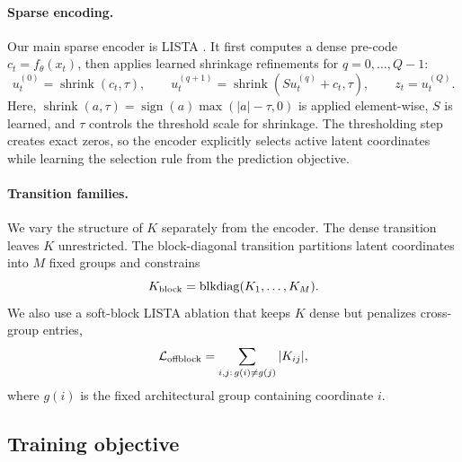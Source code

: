 \documentclass[11pt]{article}
\newcommand{\shrink}{\operatorname{shrink}}
\newcommand{\blkdiag}{\operatorname{blkdiag}}
\begin{document}
\paragraph{Sparse encoding.} Our main sparse encoder is LISTA \citep{gregor_learning_2010}. It first computes a dense pre-code \(c_t=f_\theta(x_t)\), then applies learned shrinkage refinements for $q=0,\ldots,Q-1$:
\begin{equation}
  u_t^{(0)}=\shrink(c_t,\tau),\qquad
  u_t^{(q+1)}=\shrink(Su_t^{(q)}+c_t,\tau),\qquad
  z_t=u_t^{(Q)}.
  \label{eq:lista}
\end{equation}
Here, $\shrink(a,\tau)=\operatorname{sign}(a)\max(|a|-\tau,0)$
is applied element-wise, \(S\) is learned, and \(\tau\) controls the threshold scale for shrinkage. The thresholding step creates exact zeros, so the encoder explicitly selects active latent coordinates while learning the selection rule from the prediction objective.

\paragraph{Transition families.} We vary the structure of \(K\) separately from the encoder. The dense transition leaves \(K\) unrestricted. The block-diagonal transition partitions latent coordinates into \(M\) fixed groups and constrains
\begin{equation}
  K_{\rm block}=\blkdiag(K_1,\ldots,K_M).
  \label{eq:block_transition}
\end{equation}
We also use a soft-block LISTA ablation that keeps \(K\) dense but penalizes cross-group entries,
\begin{equation}
  \mathcal{L}_{\rm offblock}
  =
  \sum_{i,j:\,g(i)\ne g(j)} |K_{ij}|,
  \label{eq:offblock_penalty}
\end{equation}
where \(g(i)\) is the fixed architectural group containing coordinate \(i\).

\subsection{Training objective}
\label{sec:method_training}
\end{document}
